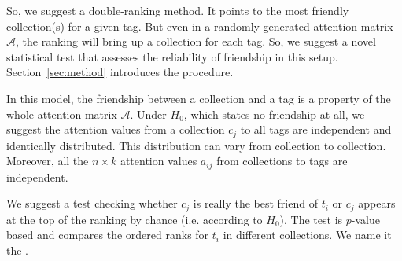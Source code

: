 So, we suggest a double-ranking method. It points to the most friendly collection(s) for a given tag. But even in a randomly generated attention matrix $\mathcal{A}$, the ranking will bring up a collection for each tag. So, we suggest a novel statistical test that assesses the reliability of friendship in this setup. Section~\ref{sec:method} introduces the procedure.




In this model, the friendship between a collection and a tag is a property of the whole attention matrix $\mathcal{A}$.
Under $H_0$, which states no friendship at all, we suggest the attention values from a collection $c_j$ to all tags are independent and identically distributed.
This distribution can vary from collection to collection. Moreover, all the $n \times k$ attention values $a_{ij}$ from collections to tags are independent.

We suggest a test checking whether $c_j$ is really the best friend of $t_i$ or $c_j$ appears at the top of the ranking by chance (i.e. according to $H_0$). The test is $p$-value based and compares the ordered ranks for $t_i$ in different collections. We name it the .


